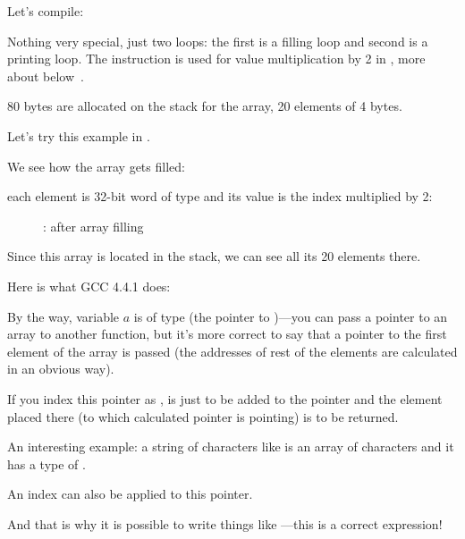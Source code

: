 

Let's compile:




Nothing very special, just two loops: the first is a filling loop and second is a printing loop.
The  instruction is used for value multiplication by 2 in \ECX, more about below~.

80 bytes are allocated on the stack for the array, 20 elements of 4 bytes.

\clearpage
Let's try this example in \olly.
\myindex{\olly}

We see how the array gets filled: 

each element is 32-bit word of \Tint type and its value is the index multiplied by 2:

\begin{figure}[H]
\centering
{}
\caption{\olly: after array filling}
\label{fig:array_simple_olly}
\end{figure}

Since this array is located in the stack, we can see all its 20 elements there.


Here is what GCC 4.4.1 does:



By the way, variable $a$ is of type   
(the pointer to \Tint{})---you can pass a pointer to an array to another function,
but it's more correct to say that a pointer to the first element of the array is passed
(the addresses of rest of the elements are calculated in an obvious way).

If you index this pointer as ,  is just to be added to the pointer 
and the element placed there (to which calculated pointer is pointing) is to be returned.

An interesting example: a string of characters like 
 is an array of characters and it has a type of .

An index can also be applied to this pointer.

And that is why it is possible to write things like ---this is a correct \CCpp expression!

